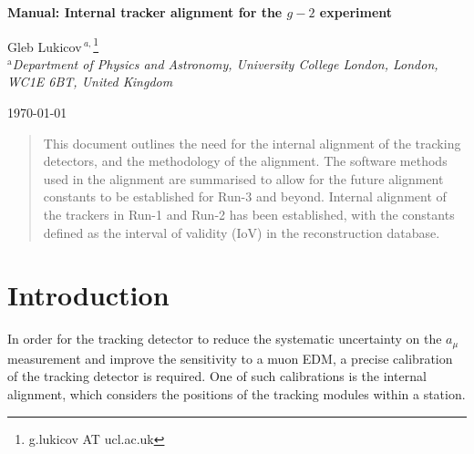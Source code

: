 \documentclass[12pt]{article}
\def\Title#1{\begin{center} {\Large {\bf #1} } \end{center}}
\begin{document}
\Title{Manual: Internal tracker alignment for the $g-2$ experiment}

\bigskip\bigskip


\begin{raggedright}  
Gleb Lukicov$\,^{a,}$\footnote{g.lukicov AT ucl.ac.uk}\\
{\it $^{\mathrm{a}}$Department of Physics and Astronomy, University College London, London, \\ WC1E 6BT, United Kingdom}
\bigskip\bigskip
\end{raggedright}

\begin{center}
\today
\end{center}

\null\vspace{\fill}
\begin{abstract}
This document outlines the need for the internal alignment of the tracking detectors, and the methodology of the alignment. The software methods used in the alignment are summarised to allow for the future alignment constants to be established for Run-3 and beyond. Internal alignment of the trackers in Run-1 and Run-2 has been established, with the constants defined as the interval of validity (IoV) in the reconstruction database. 
\end{abstract}
\vspace{\fill}

\tableofcontents

\clearpage

\section{Introduction}
In order for the tracking detector to reduce the systematic uncertainty on the $a_{\mu}$ measurement and improve the sensitivity to a muon EDM, a precise calibration of the tracking detector is required. One of such calibrations is the internal alignment, which considers the positions of the tracking modules within a station. 
\end{document}
